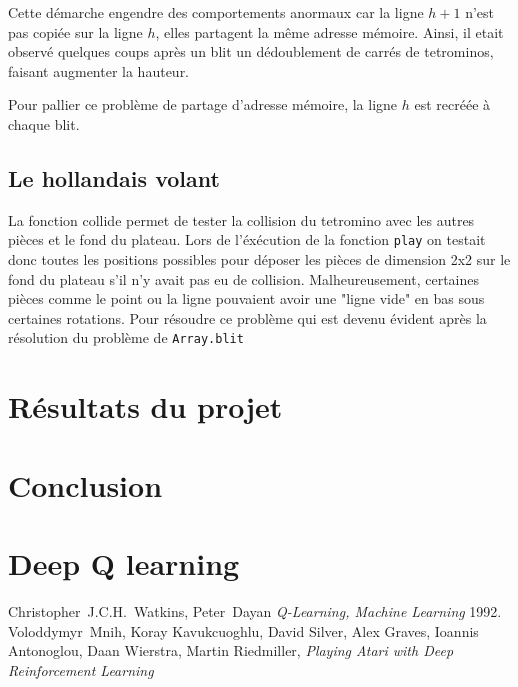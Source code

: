 \documentclass{article}
\begin{document}
Cette démarche engendre des comportements anormaux car la ligne \(h+1\) n'est
pas copiée sur la ligne \(h\), elles partagent la même adresse mémoire. Ainsi,
il etait observé quelques coups après un blit un dédoublement de carrés de
tetrominos, faisant augmenter la hauteur.

Pour pallier ce problème de partage d'adresse mémoire, la ligne \(h\) est
recréée à chaque blit.

\subsection{Le hollandais volant}
La fonction collide permet de tester la collision du tetromino avec les autres
pièces et le fond du plateau. Lors de l'éxécution de la fonction \texttt{play}
on testait donc toutes les positions possibles pour déposer les pièces de
dimension 2x2 sur le fond du plateau s'il n'y avait pas eu de collision.
Malheureusement, certaines pièces comme le point ou la ligne pouvaient avoir
une "ligne vide" en bas sous certaines rotations. Pour résoudre ce problème
qui est devenu évident après la résolution du problème de \texttt{Array.blit}

\section{R\'esultats du projet}

\section*{Conclusion}

\appendix
\section{Deep Q learning}

\begin{thebibliography}{9}
    Christopher~J.C.H.~Watkins, Peter~Dayan
    \textit{Q-Learning, Machine Learning}
    1992.
    Voloddymyr~Mnih, Koray Kavukcuoghlu, David Silver, Alex Graves, Ioannis
    Antonoglou, Daan Wierstra, Martin Riedmiller,
    \textit{Playing Atari with Deep Reinforcement Learning}
\end{thebibliography}
\end{document}
